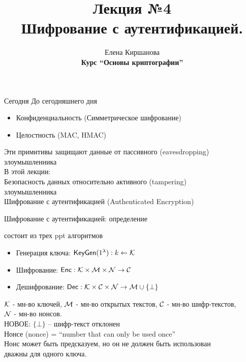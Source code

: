\documentclass[usenames,dvipsnames,8pt,aspectratio=169]{beamer}
\title{Лекция №4 \\[10pt]
	Шифрование с аутентификацией. }
\date{ Елена Киршанова \\  \textbf{Курс ``Основы криптографии''} \\  }
\begin{document}
	
\begin{frame}
	\titlepage
\end{frame}

\begin{frame}{Сегодня}
	\Large 
	До сегодняшнего дня 
	\begin{itemize}
		\item Конфиденциальность (Симметрическое шифрование)
		\item Целостность (MAC, HMAC)
	\end{itemize}
	\vspace{20pt}
	Эти примитивы защищают данные от {\color{Orange} пассивного (eavesdropping) злоумышленника}\\
	 
	\vspace{20pt}
	В этой лекции: \\
	Безопасность данных относительно {\color{Orange} активного (tampering)  \\ злоумышленника}\\[10pt]
	\LARGE Шифрование с аутентификацией (Authenticated Encryption)

\end{frame}

\begin{frame}{Шифрование с аутентификацией: определение}
\Large

{\color{Orange}{Шифрование с аутентификацией (AE)}} состоит из трех ppt алгоритмов
\begin{itemize}
	\itemsep 10pt
	\item Генерация ключа: $\textsf{KeyGen}(1^\lambda): k \leftarrow \mathcal{K}$
	\item Шифрование: $\textsf{Enc}: \mathcal{K} \times \mathcal{M} \times \mathcal{N} \rightarrow \mathcal{C}$
	\item Дешифрование:  $\textsf{Dec}: \mathcal{K} \times \mathcal{C}  \times \mathcal{N} \rightarrow \mathcal{M} \cup \{\bot\}$
\end{itemize}
\vspace{15pt}
$\mathcal{K}$ - мн-во ключей, $\mathcal{M}$ - мн-во открытых текстов, $\mathcal{C}$ - мн-во шифр-текстов,  \\ $\mathcal{N}$ - мн-во {\color{Orange} нонсов}. \\[10pt]


НОВОЕ: $\{\bot\}$ -- шифр-текст отклонен \\[10pt]


{\color{Orange} Нонсе (nonce)} = ``number that can only be used once'' \\[5pt]
Нонс может быть предсказуем, но он не должен быть использован \\ {\color{Orange} дважны} для одного ключа. \\[5pt]

\end{frame}
\end{document}

